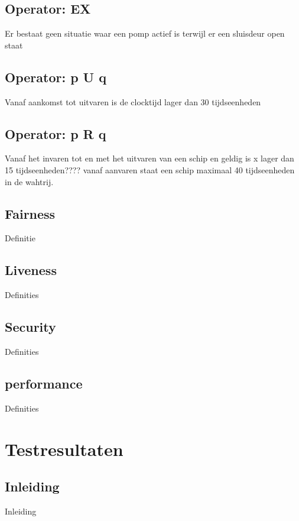 \documentclass{article}
\begin{document}
	\subsection{Operator: EX}
	Er bestaat geen situatie waar een pomp actief is terwijl er een sluisdeur open staat
	\subsection{Operator: p U q}
	Vanaf aankomst tot uitvaren is de clocktijd lager dan 30 tijdseenheden 
	\subsection{Operator: p R q}
	Vanaf het invaren tot en met het uitvaren van een schip en geldig is x lager dan 15 tijdseenheden????
	vanaf aanvaren staat een schip maximaal 40 tijdseenheden in de wahtrij.
	\subsection{Fairness}
	
	Definitie
	
	\subsection{Liveness}
	
	
	Definities

	\subsection{Security}
	
	
	Definities
	
	\subsection{performance}
	
	
	Definities
	
	\newpage
	\section{Testresultaten}
	
	\subsection{Inleiding}
	Inleiding
	
\end{document}
